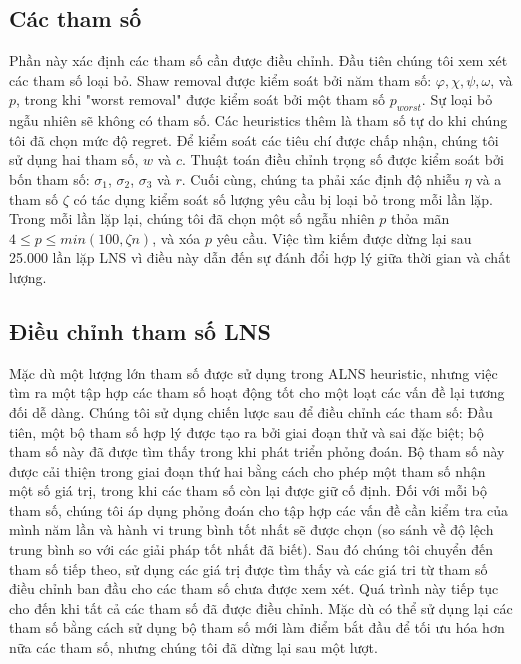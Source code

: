 \subsection{Các tham số}
Phần này xác định các tham số cần được điều chỉnh. Đầu tiên chúng tôi xem xét các tham số loại bỏ. Shaw removal được kiểm soát bởi năm tham số: $\varphi, \chi, \psi, \omega$, và $p$, trong khi "worst removal" được kiểm soát bởi một tham số $p_{worst}$. Sự loại bỏ ngẫu nhiên sẽ không có tham số. Các heuristics thêm là tham số tự do khi chúng tôi đã chọn mức độ regret.
Để kiểm soát các tiêu chí được chấp nhận, chúng tôi sử dụng hai tham số, $w$ và $c$. Thuật toán điều chỉnh trọng số được kiểm soát bởi bốn tham số: $\sigma_1$, $\sigma_2$, $\sigma_3$ và $r$. Cuối cùng, chúng ta phải xác định độ nhiễu $\eta$ và a tham số $\zeta$ có tác dụng kiểm soát số lượng yêu cầu bị loại bỏ trong mỗi lần lặp. Trong mỗi lần lặp lại, chúng tôi đã chọn một số ngẫu nhiên $p$ thỏa mãn $4 \leq p \leq min(100, \zeta n)$, và xóa $p$ yêu cầu. Việc tìm kiếm được dừng lại sau 25.000 lần lặp LNS vì điều này dẫn đến sự đánh đổi hợp lý giữa thời gian và chất lượng.

\subsection{Điều chỉnh tham số LNS}
Mặc dù một lượng lớn tham số được sử dụng trong ALNS heuristic, nhưng việc tìm ra một tập hợp các tham số hoạt động tốt cho một loạt các vấn đề lại tương đối dễ dàng. Chúng tôi sử dụng chiến lược sau để điều chỉnh các tham số: Đầu tiên, một bộ tham số hợp lý được tạo ra bởi giai đoạn thử và sai đặc biệt; bộ tham số này đã được tìm thấy trong khi phát triển phỏng đoán. Bộ tham số này được cải thiện trong giai đoạn thứ hai bằng cách cho phép một tham số nhận một số giá trị, trong khi các tham số còn lại được giữ cố định. Đối với mỗi bộ tham số, chúng tôi áp dụng phỏng đoán cho tập hợp các vấn đề cần kiểm tra của mình năm lần và hành vi trung bình tốt nhất sẽ được chọn (so sánh về độ lệch trung bình so với các giải pháp tốt nhất đã biết). Sau đó chúng tôi chuyển đến tham số tiếp theo, sử dụng các giá trị được tìm thấy và các giá tri từ tham số điều chỉnh ban đầu cho các tham số chưa được xem xét. Quá trình này tiếp tục cho đến khi tất cả các tham số đã được điều chỉnh. Mặc dù có thể sử dụng lại các tham số bằng cách sử dụng bộ tham số mới làm điểm bắt đầu để tối ưu hóa hơn nữa các tham số, nhưng chúng tôi đã dừng lại sau một lượt.

